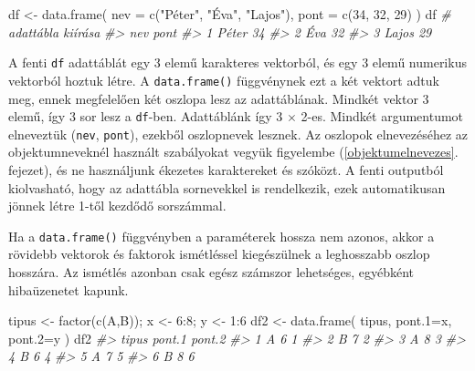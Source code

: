 \documentclass[
]{book}
\newenvironment{Shaded}{\begin{snugshade}}{\end{snugshade}}
\newcommand{\AttributeTok}[1]{\textcolor[rgb]{0.77,0.63,0.00}{#1}}
\newcommand{\CommentTok}[1]{\textcolor[rgb]{0.56,0.35,0.01}{\textit{#1}}}
\newcommand{\DecValTok}[1]{\textcolor[rgb]{0.00,0.00,0.81}{#1}}
\newcommand{\FunctionTok}[1]{\textcolor[rgb]{0.00,0.00,0.00}{#1}}
\newcommand{\NormalTok}[1]{#1}
\newcommand{\OtherTok}[1]{\textcolor[rgb]{0.56,0.35,0.01}{#1}}
\newcommand{\SpecialCharTok}[1]{\textcolor[rgb]{0.00,0.00,0.00}{#1}}
\newcommand{\StringTok}[1]{\textcolor[rgb]{0.31,0.60,0.02}{#1}}
\begin{document}
\begin{Shaded}
\begin{Highlighting}[]
\NormalTok{df }\OtherTok{\textless{}{-}} \FunctionTok{data.frame}\NormalTok{(}
  \AttributeTok{nev  =} \FunctionTok{c}\NormalTok{(}\StringTok{"Péter"}\NormalTok{, }\StringTok{"Éva"}\NormalTok{, }\StringTok{"Lajos"}\NormalTok{),}
  \AttributeTok{pont =} \FunctionTok{c}\NormalTok{(}\DecValTok{34}\NormalTok{, }\DecValTok{32}\NormalTok{, }\DecValTok{29}\NormalTok{)}
\NormalTok{) }
\NormalTok{df      }\CommentTok{\# adattábla kiírása}
\CommentTok{\#\textgreater{}     nev pont}
\CommentTok{\#\textgreater{} 1 Péter   34}
\CommentTok{\#\textgreater{} 2   Éva   32}
\CommentTok{\#\textgreater{} 3 Lajos   29}
\end{Highlighting}
\end{Shaded}

A fenti \texttt{df} adattáblát egy 3 elemű karakteres vektorból, és egy 3 elemű numerikus vektorból hoztuk létre. A \texttt{data.frame()} függvénynek ezt a két vektort adtuk meg, ennek megfelelően két oszlopa lesz az adattáblának. Mindkét vektor 3 elemű, így 3 sor lesz a \texttt{df}-ben. Adattáblánk így 3 \(\times\) 2-es. Mindkét argumentumot elneveztük (\texttt{nev}, \texttt{pont}), ezekből oszlopnevek lesznek. Az oszlopok elnevezéséhez az objektumneveknél használt szabályokat vegyük figyelembe (\ref{objektumelnevezes}. fejezet), és ne használjunk ékezetes karaktereket és szóközt. A fenti outputból kiolvasható, hogy az adattábla sornevekkel is rendelkezik, ezek automatikusan jönnek létre 1-től kezdődő sorszámmal.

Ha a \texttt{data.frame()} függvényben a paraméterek hossza nem azonos, akkor a rövidebb vektorok és faktorok ismétléssel kiegészülnek a leghosszabb oszlop hosszára. Az ismétlés azonban csak egész számszor lehetséges, egyébként hibaüzenetet kapunk.

\begin{Shaded}
\begin{Highlighting}[]
\NormalTok{tipus }\OtherTok{\textless{}{-}} \FunctionTok{factor}\NormalTok{(}\FunctionTok{c}\NormalTok{(}\StringTok{\textquotesingle{}A\textquotesingle{}}\NormalTok{,}\StringTok{\textquotesingle{}B\textquotesingle{}}\NormalTok{)); x }\OtherTok{\textless{}{-}} \DecValTok{6}\SpecialCharTok{:}\DecValTok{8}\NormalTok{; y }\OtherTok{\textless{}{-}} \DecValTok{1}\SpecialCharTok{:}\DecValTok{6}
\NormalTok{df2 }\OtherTok{\textless{}{-}} \FunctionTok{data.frame}\NormalTok{(}
\NormalTok{   tipus, }
   \AttributeTok{pont.1=}\NormalTok{x, }
   \AttributeTok{pont.2=}\NormalTok{y}
\NormalTok{)}
\NormalTok{df2}
\CommentTok{\#\textgreater{}   tipus pont.1 pont.2}
\CommentTok{\#\textgreater{} 1     A      6      1}
\CommentTok{\#\textgreater{} 2     B      7      2}
\CommentTok{\#\textgreater{} 3     A      8      3}
\CommentTok{\#\textgreater{} 4     B      6      4}
\CommentTok{\#\textgreater{} 5     A      7      5}
\CommentTok{\#\textgreater{} 6     B      8      6}
\end{Highlighting}
\end{Shaded}
\end{document}
